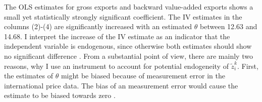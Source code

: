 \par 
The OLS estimates for gross exports and backward value-added exports shows a small yet statistically strongly significant coefficient. The IV estimates in the columns (2)-(4) are significantly increased with an estimated $\theta$ between 12.63 and 14.68. I interpret the increase of the IV estimate as an indicator that the independent variable is endogenous, since otherwise both estimates should show no significant difference \textcite{hausman1978}. 
From a substantial point of view, there are mainly two reasons, why I use an instrument to account for potential endogeneity of $\tilde{z}^k_i $. First, the estimates of $\theta$ might be biased because of measurement error in the international price data.  The bias of an measurement error would cause the estimate to be biased towards zero \parencite{AngristKrueger01}. 
